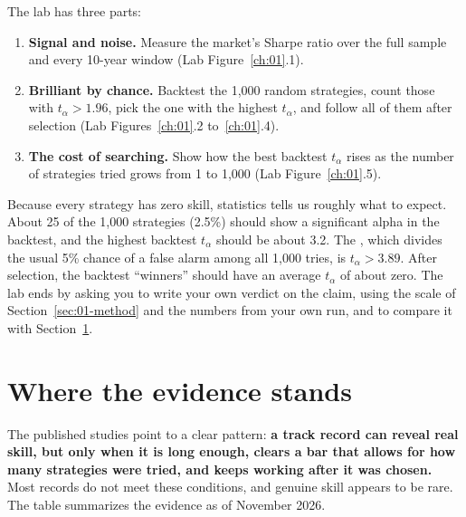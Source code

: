 The lab has three parts:
\begin{enumerate}
  \item \textbf{Signal and noise.} Measure the market's Sharpe ratio over the full sample and every 10-year window (Lab Figure~\ref{ch:01}.1).
  \item \textbf{Brilliant by chance.} Backtest the 1,000 random strategies, count those with $t_\alpha > 1.96$, pick the one with the highest $t_\alpha$, and follow all of them after selection (Lab Figures~\ref{ch:01}.2 to~\ref{ch:01}.4).
  \item \textbf{The cost of searching.} Show how the best backtest $t_\alpha$ rises as the number of strategies tried grows from 1 to 1,000 (Lab Figure~\ref{ch:01}.5).
\end{enumerate}

Because every strategy has zero skill, statistics tells us roughly what to expect. About 25 of the 1,000 strategies (2.5\%) should show a significant alpha in the backtest, and the highest backtest $t_\alpha$ should be about 3.2. The , which divides the usual 5\% chance of a false alarm among all 1,000 tries, is $t_\alpha > 3.89$. After selection, the backtest ``winners'' should have an average $t_\alpha$ of about zero. The lab ends by asking you to write your own verdict on the claim, using the scale of Section~\ref{sec:01-method} and the numbers from your own run, and to compare it with Section~\ref{sec:01-verdict}.

\section{Where the evidence stands}
\label{sec:01-verdict}

The published studies point to a clear pattern: \textbf{a track record can reveal real skill, but only when it is long enough, clears a bar that allows for how many strategies were tried, and keeps working after it was chosen.} Most records do not meet these conditions, and genuine skill appears to be rare. The table summarizes the evidence as of November 2026.

